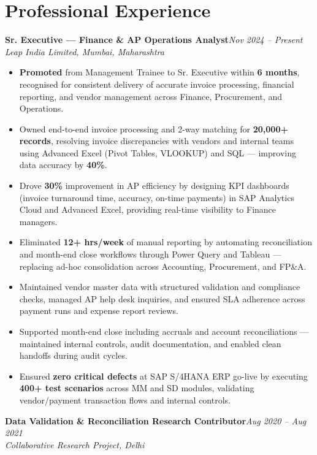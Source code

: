\documentclass[10pt, letterpaper]{article}
\newcommand{\role}[3]{%
  \vspace{2pt}%
  {\bfseries #1}\hfill{\small\color{muted}\textit{#3}}\\[-2pt]%
  {\small\color{muted}\textit{#2}}%
}
\begin{document}
\section{Professional Experience}

\role{Sr. Executive — Finance \& AP Operations Analyst}{Leap India Limited, Mumbai, Maharashtra}{Nov 2024 – Present}

\begin{itemize}
  \item \textbf{Promoted} from Management Trainee to Sr. Executive within \textbf{6 months}, recognised for consistent delivery of accurate invoice processing, financial reporting, and vendor management across Finance, Procurement, and Operations.
  \item Owned end-to-end invoice processing and 2-way matching for \textbf{20,000+ records}, resolving invoice discrepancies with vendors and internal teams using Advanced Excel (Pivot Tables, VLOOKUP) and SQL — improving data accuracy by \textbf{40\%}.
  \item Drove \textbf{30\%} improvement in AP efficiency by designing KPI dashboards (invoice turnaround time, accuracy, on-time payments) in SAP Analytics Cloud and Advanced Excel, providing real-time visibility to Finance managers.
  \item Eliminated \textbf{12+ hrs/week} of manual reporting by automating reconciliation and month-end close workflows through Power Query and Tableau — replacing ad-hoc consolidation across Accounting, Procurement, and FP\&A.
  \item Maintained vendor master data with structured validation and compliance checks, managed AP help desk inquiries, and ensured SLA adherence across payment runs and expense report reviews.
  \item Supported month-end close including accruals and account reconciliations — maintained internal controls, audit documentation, and enabled clean handoffs during audit cycles.
  \item Ensured \textbf{zero critical defects} at SAP S/4HANA ERP go-live by executing \textbf{400+ test scenarios} across MM and SD modules, validating vendor/payment transaction flows and internal controls.
\end{itemize}

\vspace{1pt}

\role{Data Validation \& Reconciliation Research Contributor}{Collaborative Research Project, Delhi}{Aug 2020 – Aug 2021}
\end{document}
